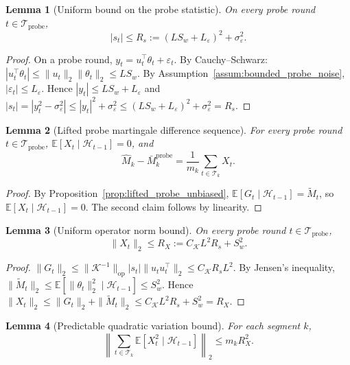 \documentclass[12pt]{article}
\newcommand{\E}{\mathbb{E}}
\newcommand{\op}{\mathrm{op}}
\newcommand{\cH}{\mathcal{H}}
\newcommand{\cT}{\mathcal{T}}
\newcommand{\cTprobe}{\mathcal{T}_{\mathrm{probe}}}
\newtheorem{lemma}{Lemma}
\theoremstyle{plain}
\theoremstyle{definition}
\begin{document}
\begin{lemma}[Uniform bound on the probe statistic]
\label{lem:st_bound}
On every probe round $t \in \cTprobe$,
\[
|s_t| \le R_s := (L S_w + L_\varepsilon)^2 + \sigma_\varepsilon^2.
\]
\end{lemma}

\begin{proof}
On a probe round, $y_t = u_t^\top \theta_t + \varepsilon_t$. By Cauchy--Schwarz: $|u_t^\top \theta_t| \le \|u_t\|_2 \|\theta_t\|_2 \le L S_w$. By Assumption~\ref{assum:bounded_probe_noise}, $|\varepsilon_t| \le L_\varepsilon$. Hence $|y_t| \le L S_w + L_\varepsilon$ and $|s_t| = |y_t^2 - \sigma_\varepsilon^2| \le |y_t|^2 + \sigma_\varepsilon^2 \le (L S_w + L_\varepsilon)^2 + \sigma_\varepsilon^2 = R_s$.
\end{proof}

\begin{lemma}[Lifted probe martingale difference sequence]
\label{lem:lifted_mds}
For every probe round $t \in \cTprobe$, $\E[X_t \mid \cH_{t-1}] = 0$, and
\[
\widehat{M}_k - \bar{M}_k^{\mathrm{probe}} = \frac{1}{m_k}\sum_{t \in \cT_k} X_t.
\]
\end{lemma}

\begin{proof}
By Proposition~\ref{prop:lifted_probe_unbiased}, $\E[G_t \mid \cH_{t-1}] = \widetilde{M}_t$, so $\E[X_t \mid \cH_{t-1}] = 0$. The second claim follows by linearity.
\end{proof}

\begin{lemma}[Uniform operator norm bound]
\label{lem:operator_bound}
On every probe round $t \in \cTprobe$,
\[
\|X_t\|_2 \le R_X := C_{\mathcal{K}} L^2 R_s + S_w^2.
\]
\end{lemma}

\begin{proof}
$\|G_t\|_2 \le \|\mathcal{K}^{-1}\|_{\op} |s_t| \|u_t u_t^\top\|_2 \le C_{\mathcal{K}} R_s L^2$. By Jensen's inequality, $\|\widetilde{M}_t\|_2 \le \E[\|\theta_t\|_2^2 \mid \cH_{t-1}] \le S_w^2$. Hence $\|X_t\|_2 \le \|G_t\|_2 + \|\widetilde{M}_t\|_2 \le C_{\mathcal{K}} L^2 R_s + S_w^2 = R_X$.
\end{proof}

\begin{lemma}[Predictable quadratic variation bound]
\label{lem:pqv_bound}
For each segment $k$,
\[
\left\|\sum_{t \in \cT_k} \E[X_t^2 \mid \cH_{t-1}]\right\|_2 \le m_k R_X^2.
\]
\end{lemma}
\end{document}
